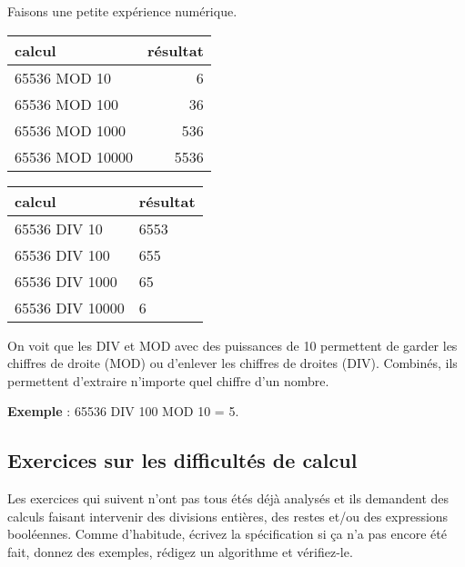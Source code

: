 				Faisons une petite expérience numérique.
				\begin{center}
				\begin{tabular}{|l|r|}\hline
					calcul & résultat \\\hline
					\hline
					65536 MOD 10 & 6 \\  
					65536 MOD 100 & 36 \\  
					65536 MOD 1000 & 536 \\  
					65536 MOD 10000 & 5536 \\ 
					\hline 
				\end{tabular}
				\qquad
				\begin{tabular}{|l|l|}\hline
					calcul & résultat \\\hline
					\hline
					65536 DIV 10 & 6553 \\  
					65536 DIV 100 & 655 \\  
					65536 DIV 1000 & 65 \\  
					65536 DIV 10000 & 6 \\ 
					\hline 
				\end{tabular}
				\end{center}
			
				On voit que les DIV et MOD avec des puissances de 10
				permettent de garder les chiffres de droite (MOD)
				ou d'enlever les chiffres de droites (DIV).
				Combinés, ils permettent d'extraire n'importe quel
				chiffre d'un nombre.
				
				\textbf{Exemple} : 65536 DIV 100 MOD 10 = 5.
									
		\subsection{Exercices sur les difficultés de calcul}
		\label{prem-ex-cplx}
		
			Les exercices qui suivent n'ont pas tous étés déjà analysés
			et ils demandent des calculs faisant intervenir
			des divisions entières, des restes et/ou des expressions booléennes.
			Comme d'habitude, écrivez la spécification
			si ça n'a pas encore été fait,
			donnez des exemples, rédigez un algorithme
			et vérifiez-le.
		

